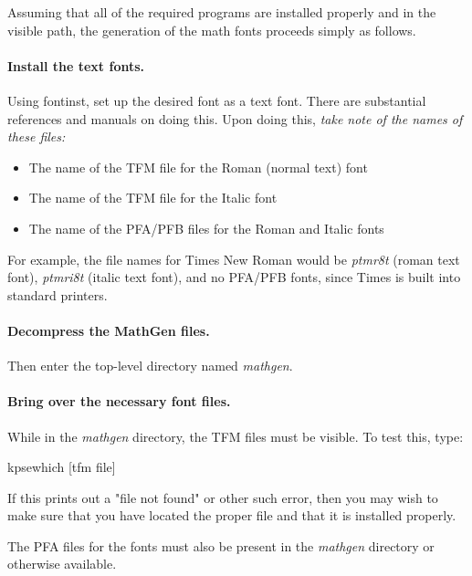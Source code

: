 
Assuming that all of the required programs are installed properly and in the
visible path, the generation of the math fonts proceeds simply as follows.

\paragraph{Install the text fonts.} Using fontinst, set up the desired font as a
text font. There are substantial references and manuals on doing this. Upon
doing this, \emph{take note of the names of these files:}
\begin{itemize}
\item The name of the \ac{TFM} file for the Roman (normal text) font
\item The name of the \ac{TFM} file for the Italic font
\item The name of the \ac{PFA/PFB} files for the Roman and Italic fonts
\end{itemize}
For example, the file names for Times New Roman would be \emph{ptmr8t} (roman
text font), \emph{ptmri8t} (italic text font), and no \ac{PFA/PFB} fonts, since
Times is built into standard printers.

\paragraph{Decompress the MathGen files.} Then enter the top-level directory
named \emph{mathgen}.

\paragraph{Bring over the necessary font files.} While in the \emph{mathgen}
directory, the \ac{TFM} files must be visible. To test this, type:
\begin{center}
kpsewhich [\ac{tfm} file]
\end{center}
If this prints out a "file not found" or other such error, then you may wish to
make sure that you have located the proper file and that it is installed
properly.

The \ac{PFA} files for the fonts must also be present in the \emph{mathgen}
directory or otherwise available.

